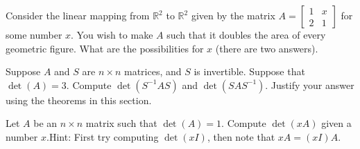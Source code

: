 \begin{exercise}
Consider the linear mapping from ${\mathbb R}^2$ to ${\mathbb R}^2$
given by the  matrix
$A = \left[ \begin{smallmatrix}
1 & x \\
2 & 1
\end{smallmatrix} \right]$
for some number $x$.  You wish to make $A$ such that it doubles the area of
every geometric figure.  What are the possibilities for $x$ (there are two
answers).
\end{exercise}

\begin{exercise}
Suppose $A$ and $S$ are $n \times n$ matrices, and $S$ is invertible.
Suppose that $\det(A) = 3$.  Compute $\det(S^{-1}AS)$ and 
$\det(SAS^{-1})$.  Justify your answer using the theorems in this section.
\end{exercise}

\begin{exercise}
Let $A$ be an $n \times n$ matrix such that $\det(A)=1$.
Compute $\det(x A)$ given a number $x$.\linebreak[2]
Hint: First try computing
$\det(xI)$, then note that $xA = (xI)A$.
\end{exercise}

\setcounter{exercise}{100}

